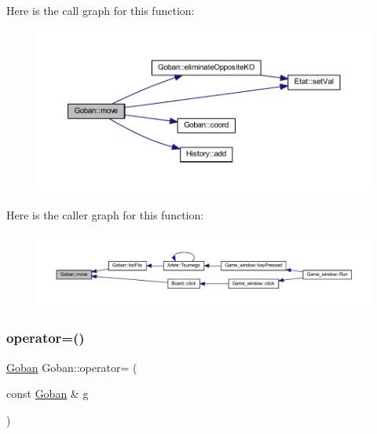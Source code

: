 Here is the call graph for this function\+:\nopagebreak
\begin{figure}[H]
\begin{center}
\leavevmode
\includegraphics[width=350pt]{class_goban_a7dd1a7b53322bde2a831a923059e43a3_cgraph}
\end{center}
\end{figure}
Here is the caller graph for this function\+:\nopagebreak
\begin{figure}[H]
\begin{center}
\leavevmode
\includegraphics[width=350pt]{class_goban_a7dd1a7b53322bde2a831a923059e43a3_icgraph}
\end{center}
\end{figure}
\mbox{\label{class_goban_af02f839ac464fc547dd98bc44bae1ef8}} 
\subsubsection{\texorpdfstring{operator=()}{operator=()}}
{\footnotesize\ttfamily \hyperlink{class_goban}{Goban} Goban\+::operator= (\begin{DoxyParamCaption}\item[{const \hyperlink{class_goban}{Goban} \&}]{g }\end{DoxyParamCaption})}

\mbox{\label{class_goban_a39eb0323bdb4f3cb5fc00719dd47f938}} 
